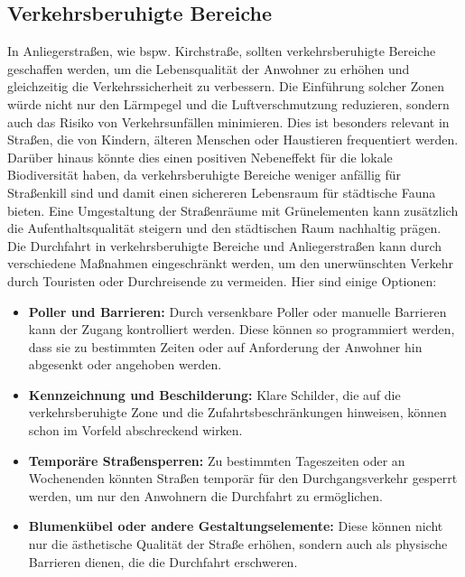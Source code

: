 \subsection{Verkehrsberuhigte Bereiche}
In Anliegerstraßen, wie bspw. Kirchstraße, sollten verkehrsberuhigte Bereiche geschaffen werden, um die Lebensqualität der Anwohner zu erhöhen und gleichzeitig die Verkehrssicherheit zu verbessern. Die Einführung solcher Zonen würde nicht nur den Lärmpegel und die Luftverschmutzung reduzieren, sondern auch das Risiko von Verkehrsunfällen minimieren. Dies ist besonders relevant in Straßen, die von Kindern, älteren Menschen oder Haustieren frequentiert werden. Darüber hinaus könnte dies einen positiven Nebeneffekt für die lokale Biodiversität haben, da verkehrsberuhigte Bereiche weniger anfällig für Straßenkill sind und damit einen sichereren Lebensraum für städtische Fauna bieten. Eine Umgestaltung der Straßenräume mit Grünelementen kann zusätzlich die Aufenthaltsqualität steigern und den städtischen Raum nachhaltig prägen.
Die Durchfahrt in verkehrsberuhigte Bereiche und Anliegerstraßen kann durch verschiedene Maßnahmen eingeschränkt werden, um den unerwünschten Verkehr durch Touristen oder Durchreisende zu vermeiden. Hier sind einige Optionen:
\begin{itemize}
\item\textbf{Poller und Barrieren:} Durch versenkbare Poller oder manuelle Barrieren kann der Zugang kontrolliert werden. Diese können so programmiert werden, dass sie zu bestimmten Zeiten oder auf Anforderung der Anwohner hin abgesenkt oder angehoben werden.

\item\textbf{Kennzeichnung und Beschilderung:} Klare Schilder, die auf die verkehrsberuhigte Zone und die Zufahrtsbeschränkungen hinweisen, können schon im Vorfeld abschreckend wirken. 

\item\textbf{Temporäre Straßensperren:} Zu bestimmten Tageszeiten oder an Wochenenden könnten Straßen temporär für den Durchgangsverkehr gesperrt werden, um nur den Anwohnern die Durchfahrt zu ermöglichen.

\item\textbf{Blumenkübel oder andere Gestaltungselemente:} Diese können nicht nur die ästhetische Qualität der Straße erhöhen, sondern auch als physische Barrieren dienen, die die Durchfahrt erschweren.
\end{itemize}